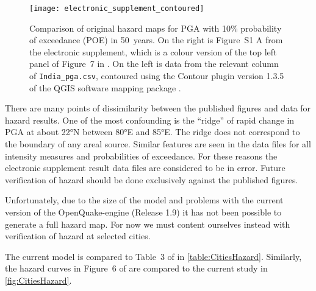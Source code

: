 \documentclass{article}
\begin{document}
\begin{figure}
\begin{adjustbox}{center}
\texttt{[image: electronic\_supplement\_contoured]}
\end{adjustbox}
\caption[Comparison of original hazard maps in paper and electronic supplement]{
Comparison of original hazard maps for PGA with 10\% probability of exceedance (POE) in 50~years. 
On the right is Figure~S1 A from the electronic supplement, which is a colour version of the top left panel of Figure~7 in \cite{nath2012probabilistic}. 
On the left is data from the relevant column of \texttt{India\_pga.csv}, contoured using the Contour plugin version 1.3.5 of the QGIS software mapping package \citep{qgis2016user}.}
\label{fig:ElectronicSupplement}
\end{figure}

There are many points of dissimilarity between the published figures and data for hazard results.
One of the most confounding is the ``ridge'' of rapid change in PGA at about 22°N between 80°E and 85°E. 
The ridge does not correspond to the boundary of any areal source.
Similar features are seen in the data files for all intensity measures and probabilities of exceedance.
For these reasons the electronic supplement result data files are considered to be in error.
Future verification of hazard should be done exclusively against the published figures.

Unfortunately, due to the size of the model and problems with the current version of the OpenQuake-engine (Release 1.9) it has not been possible to generate a full hazard map.
For now we must content ourselves instead with verification of hazard at selected cities.

The current model is compared to Table~3 of \cite{nath2012probabilistic} in \autoref{table:CitiesHazard}. 
Similarly, the hazard curves in Figure~6 of \cite{nath2012probabilistic} are compared to the current study in \autoref{fig:CitiesHazard}.
\end{document}
